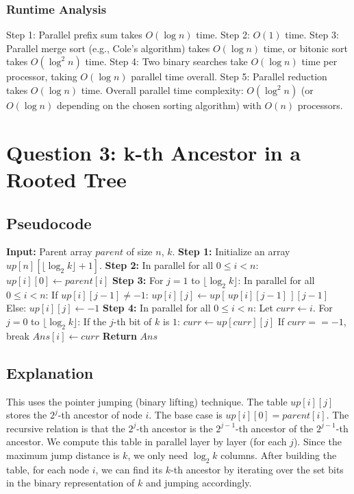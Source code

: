 \documentclass{article}
\begin{document}
\subsubsection{Runtime Analysis}
Step 1: Parallel prefix sum takes $O(\log n)$ time.
Step 2: $O(1)$ time.
Step 3: Parallel merge sort (e.g., Cole's algorithm) takes $O(\log n)$ time, or bitonic sort takes $O(\log^2 n)$ time.
Step 4: Two binary searches take $O(\log n)$ time per processor, taking $O(\log n)$ parallel time overall.
Step 5: Parallel reduction takes $O(\log n)$ time.
Overall parallel time complexity: $O(\log^2 n)$ (or $O(\log n)$ depending on the chosen sorting algorithm) with $O(n)$ processors.

\section{Question 3: k-th Ancestor in a Rooted Tree}

\subsection{Pseudocode}
\begin{algorithm}
\caption{Parallel k-th Ancestor}
\begin{algorithmic}[1]
\State \textbf{Input:} Parent array $parent$ of size $n$, $k$.
\State \textbf{Step 1:} Initialize an array $up[n][\lfloor \log_2 k \rfloor + 1]$.
\State \textbf{Step 2:} In parallel for all $0 \le i < n$:
\State \quad $up[i][0] \gets parent[i]$
\State \textbf{Step 3:} For $j = 1$ to $\lfloor \log_2 k \rfloor$:
\State \quad In parallel for all $0 \le i < n$:
\State \quad \quad If $up[i][j-1] \neq -1$:
\State \quad \quad \quad $up[i][j] \gets up[\,up[i][j-1]\,][j-1]$
\State \quad \quad Else:
\State \quad \quad \quad $up[i][j] \gets -1$
\State \textbf{Step 4:} In parallel for all $0 \le i < n$:
\State \quad Let $curr \gets i$.
\State \quad For $j = 0$ to $\lfloor \log_2 k \rfloor$:
\State \quad \quad If the $j$-th bit of $k$ is $1$:
\State \quad \quad \quad $curr \gets up[curr][j]$
\State \quad \quad \quad If $curr == -1$, break
\State \quad $Ans[i] \gets curr$
\State \textbf{Return} $Ans$
\end{algorithmic}
\end{algorithm}

\subsection{Explanation}
This uses the pointer jumping (binary lifting) technique. The table $up[i][j]$ stores the $2^j$-th ancestor of node $i$. The base case is $up[i][0] = parent[i]$. The recursive relation is that the $2^j$-th ancestor is the $2^{j-1}$-th ancestor of the $2^{j-1}$-th ancestor. We compute this table in parallel layer by layer (for each $j$). Since the maximum jump distance is $k$, we only need $\log_2 k$ columns. After building the table, for each node $i$, we can find its $k$-th ancestor by iterating over the set bits in the binary representation of $k$ and jumping accordingly. 
\end{document}

